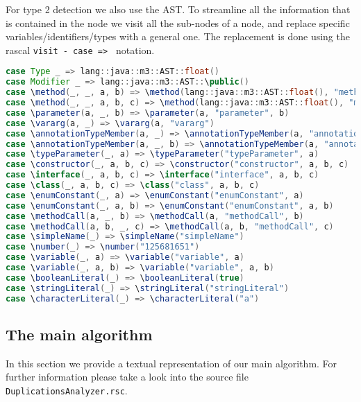 \documentclass{uva-inf-article}
\begin{document}
For type 2 detection we also use the AST. To streamline all the information that is contained in the node we visit all the sub-nodes of a node,  and replace specific variables/identifiers/types with a general one. The replacement is done using the rascal \texttt{visit - case => } notation.

\begin{lstlisting}[language=Java, style=mystyle,caption={Node elements stripping method for type-2 clone detection.},captionpos=b]
case Type _ => lang::java::m3::AST::float()
case Modifier _ => lang::java::m3::AST::\public()
case \method(_, _, a, b) => \method(lang::java::m3::AST::float(), "method", a, b)
case \method(_, _, a, b, c) => \method(lang::java::m3::AST::float(), "method", a, b, c)
case \parameter(a, _, b) => \parameter(a, "parameter", b)
case \vararg(a, _) => \vararg(a, "vararg") 
case \annotationTypeMember(a, _) => \annotationTypeMember(a, "annotationTypeMember")
case \annotationTypeMember(a, _, b) => \annotationTypeMember(a, "annotationTypeMember", b)
case \typeParameter(_, a) => \typeParameter("typeParameter", a)
case \constructor(_, a, b, c) => \constructor("constructor", a, b, c)
case \interface(_, a, b, c) => \interface("interface", a, b, c)
case \class(_, a, b, c) => \class("class", a, b, c)
case \enumConstant(_, a) => \enumConstant("enumConstant", a) 
case \enumConstant(_, a, b) => \enumConstant("enumConstant", a, b)
case \methodCall(a, _, b) => \methodCall(a, "methodCall", b)
case \methodCall(a, b, _, c) => \methodCall(a, b, "methodCall", c)
case \simpleName(_) => \simpleName("simpleName")
case \number(_) => \number("125681651")
case \variable(_, a) => \variable("variable", a) 
case \variable(_, a, b) => \variable("variable", a, b) 
case \booleanLiteral(_) => \booleanLiteral(true)
case \stringLiteral(_) => \stringLiteral("stringLiteral")
case \characterLiteral(_) => \characterLiteral("a")
\end{lstlisting}

\subsection{The main algorithm}

In this section we provide a textual representation of our main algorithm. For further information please take a look into the source file \texttt{DuplicationsAnalyzer.rsc}.
\end{document}
